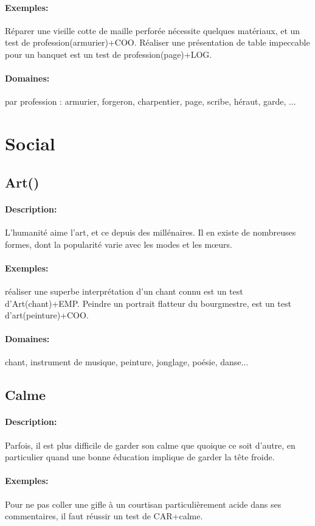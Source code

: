 \documentclass[10pt,a4paper,twocolumn]{book}
\begin{document}
\paragraph{Exemples:}Réparer une vieille cotte de maille perforée nécessite quelques matériaux, et un test de profession(armurier)+COO. Réaliser une présentation de table impeccable pour un banquet est un test de profession(page)+LOG.
\paragraph{Domaines:}par profession : armurier, forgeron, charpentier, page, scribe, héraut, garde, ...

\section{Social}
\subsection{Art()}
\paragraph{Description:}L'humanité aime l'art, et ce depuis des millénaires. Il en existe de nombreuses formes, dont la popularité varie avec les modes et les mœurs. 
\paragraph{Exemples:}réaliser une superbe interprétation d'un chant connu est un test d'Art(chant)+EMP. Peindre un portrait flatteur du bourgmestre, est un test d'art(peinture)+COO.
\paragraph{Domaines:}chant, instrument de musique, peinture, jonglage, poésie, danse...
\subsection{Calme}
\paragraph{Description:}Parfois, il est plus difficile de garder son calme que quoique ce soit d'autre, en particulier quand une bonne éducation implique de garder la tête froide.
\paragraph{Exemples:}Pour ne pas coller une gifle à un courtisan particulièrement acide dans ses commentaires, il faut réussir un test de CAR+calme.
\end{document}
